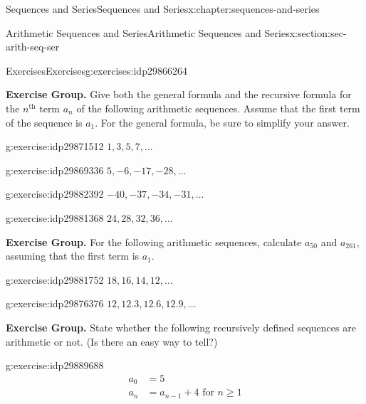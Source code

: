 \documentclass[twoside,10pt,]{book}
\numberwithin{equation}{section}
\newcommand{\nth}{{n^{\text{th}}}}
\newcommand{\amp}{&}
\begin{document}
\begin{chapterptx}{Sequences and Series}{}{Sequences and Series}{}{}{x:chapter:sequences-and-series}
\begin{sectionptx}{Arithmetic Sequences and Series}{}{Arithmetic Sequences and Series}{}{}{x:section:sec-arith-seq-ser}
\begin{exercises-subsection}{Exercises}{}{Exercises}{}{}{g:exercises:idp29866264}
\par\medskip\noindent%
\textbf{Exercise Group.}\space\space%
Give both the general formula  and the recursive formula for the \(\nth{}\) term \(a_n\) of the following arithmetic sequences.  Assume that the first term of the sequence is \(a_1\).  For the general formula, be sure to simplify your answer.\begin{exercisegroup}
\begin{divisionexerciseeg}{7}{}{}{g:exercise:idp29871512}%
\(1, 3, 5, 7, \ldots\)\end{divisionexerciseeg}%
\begin{divisionexerciseeg}{8}{}{}{g:exercise:idp29869336}%
\(5, -6, -17, -28, \ldots\)\end{divisionexerciseeg}%
\begin{divisionexerciseeg}{9}{}{}{g:exercise:idp29882392}%
\(-40, -37, -34, -31, \ldots\)\end{divisionexerciseeg}%
\begin{divisionexerciseeg}{10}{}{}{g:exercise:idp29881368}%
\(24, 28, 32, 36, \ldots\)\end{divisionexerciseeg}%
\end{exercisegroup}
\par\medskip\noindent
\par\medskip\noindent%
\textbf{Exercise Group.}\space\space%
For the following arithmetic sequences, calculate \(a_{50}\) and \(a_{261}\), assuming that the first term is \(a_1\).\begin{exercisegroup}
\begin{divisionexerciseeg}{11}{}{}{g:exercise:idp29881752}%
\(18, 16, 14, 12, \ldots\)\end{divisionexerciseeg}%
\begin{divisionexerciseeg}{12}{}{}{g:exercise:idp29876376}%
\(12, 12.3, 12.6, 12.9, \ldots\)\end{divisionexerciseeg}%
\end{exercisegroup}
\par\medskip\noindent
\par\medskip\noindent%
\textbf{Exercise Group.}\space\space%
State whether the following recursively defined sequences are arithmetic or not.  (Is there an easy way to tell?)\begin{exercisegroup}
\begin{divisionexerciseeg}{13}{}{}{g:exercise:idp29889688}%
%
\begin{align*}
a_0 \amp = 5\\
a_n\amp = a_{n-1}+4 \text{   for }n\ge 1

\end{align*}
\end{divisionexerciseeg}
\end{exercisegroup}
\end{exercises-subsection}
\end{sectionptx}
\end{chapterptx}
\end{document}
